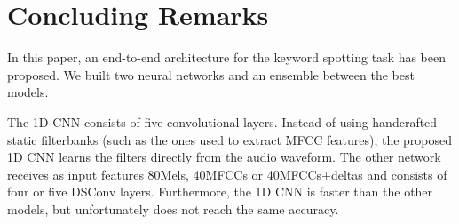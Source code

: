 \documentclass[conference]{IEEEtran}
\begin{document}
\begin{table}[]
\caption{Ensemble}
\end{table}



\pagebreak
\section{Concluding Remarks}
In this paper, an end-to-end architecture for the keyword spotting task has been proposed. We built two neural networks and an ensemble between the best models.

The 1D CNN consists of five convolutional layers. Instead of using handcrafted static filterbanks (such as the ones used to extract MFCC features), the proposed 1D CNN learns the filters directly from the audio waveform. The other network receives as input features 80Mels, 40MFCCs or 40MFCCs+deltas and consists of four or five DSConv layers. Furthermore, the 1D CNN is faster than the other models, but unfortunately does not reach the same accuracy.
\end{document}
